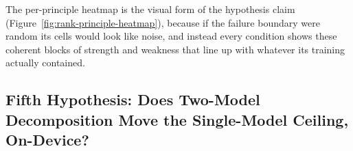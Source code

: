The per-principle heatmap is the visual form of the hypothesis claim (Figure~\ref{fig:rank-principle-heatmap}), because if the failure boundary were random its cells would look like noise, and instead every condition shows these coherent blocks of strength and weakness that line up with whatever its training actually contained. 



\subsection{Fifth Hypothesis: Does Two-Model Decomposition Move the Single-Model Ceiling, On-Device?}
\label{subsec:h5-thinker-executor}

